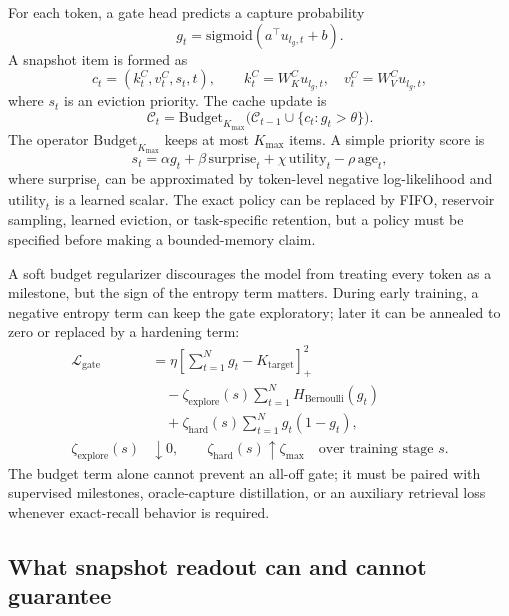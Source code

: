 \documentclass[preprint,12pt]{elsarticle}
\newcommand{\Cache}{\mathcal{C}}
\newcommand{\sigmoid}{\mathrm{sigmoid}}
\begin{document}
For each token, a gate head predicts a capture probability
\begin{equation}
\label{eq:gate}
g_t = \sigmoid(a^\top u_{l_g,t}+b).
\end{equation}
A snapshot item is formed as
\begin{equation}
\label{eq:item}
c_t = (k_t^C, v_t^C, s_t, t),\qquad k_t^C=W_K^C u_{l_g,t},\quad v_t^C=W_V^C u_{l_g,t},
\end{equation}
where $s_t$ is an eviction priority. The cache update is
\begin{equation}
\label{eq:budget-update}
\Cache_t = \mathrm{Budget}_{K_{\max}}\Big(\Cache_{t-1}\cup \{c_t: g_t>\theta\}\Big).
\end{equation}
The operator $\mathrm{Budget}_{K_{\max}}$ keeps at most $K_{\max}$ items. A simple priority score is
\begin{equation}
\label{eq:priority}
s_t = \alpha g_t + \beta\,\mathrm{surprise}_t + \chi\,\mathrm{utility}_t - \rho\,\mathrm{age}_t,
\end{equation}
where $\mathrm{surprise}_t$ can be approximated by token-level negative log-likelihood and $\mathrm{utility}_t$ is a learned scalar. The exact policy can be replaced by FIFO, reservoir sampling, learned eviction, or task-specific retention, but a policy must be specified before making a bounded-memory claim.

A soft budget regularizer discourages the model from treating every token as a milestone, but the sign of the entropy term matters. During early training, a negative entropy term can keep the gate exploratory; later it can be annealed to zero or replaced by a hardening term:
\begin{align}
\label{eq:budget-loss}
\mathcal{L}_{\mathrm{gate}}
&= \eta\left[\sum_{t=1}^{N} g_t - K_{\mathrm{target}}\right]_+^2 \\
&\quad - \zeta_{\mathrm{explore}}(s)\sum_{t=1}^{N} H_{\mathrm{Bernoulli}}(g_t) \\
&\quad + \zeta_{\mathrm{hard}}(s)\sum_{t=1}^{N}g_t(1-g_t), \\
\zeta_{\mathrm{explore}}(s)&\downarrow 0,\qquad
\zeta_{\mathrm{hard}}(s)\uparrow \zeta_{\max}
\quad\text{over training stage }s.
\end{align}
The budget term alone cannot prevent an all-off gate; it must be paired with supervised milestones, oracle-capture distillation, or an auxiliary retrieval loss whenever exact-recall behavior is required.

\subsection{What snapshot readout can and cannot guarantee}
\end{document}
